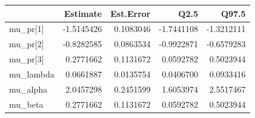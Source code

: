 
\begin{tabular}{lrrrr}
\toprule
  & Estimate & Est.Error & Q2.5 & Q97.5\\
\midrule
mu\_pr[1] & -1.5145426 & 0.1083046 & -1.7441108 & -1.3212111\\
mu\_pr[2] & -0.8282585 & 0.0863534 & -0.9922871 & -0.6579283\\
mu\_pr[3] & 0.2771662 & 0.1131672 & 0.0592782 & 0.5023944\\
mu\_lambda & 0.0661887 & 0.0135754 & 0.0406700 & 0.0933416\\
mu\_alpha & 2.0457298 & 0.2451599 & 1.6053974 & 2.5517467\\
\addlinespace
mu\_beta & 0.2771662 & 0.1131672 & 0.0592782 & 0.5023944\\
\bottomrule
\end{tabular}
